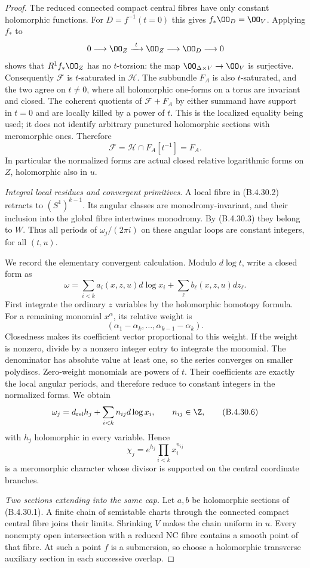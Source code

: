 \begin{proof}
The reduced connected compact central fibres
have only constant holomorphic functions.
For $D=f^{-1}(t=0)$ this gives
$f_*\OO_D=\OO_V$. Applying $f_*$ to
\[
 0\longrightarrow\OO_Z\xrightarrow{\ t\ }
 \OO_Z\longrightarrow\OO_D\longrightarrow0
\]
shows that $R^1f_*\OO_Z$ has no $t$-torsion:
the map $\OO_{\Delta\times V}\to\OO_V$ is
surjective. Consequently $\mathcal F$ is
$t$-saturated in $\mathcal H$. The subbundle
$F_A$ is also $t$-saturated, and the two agree
on $t\ne0$, where all holomorphic one-forms
on a torus are invariant and closed. The
coherent quotients of $\mathcal F+F_A$ by
either summand have support in $t=0$ and
are locally killed by a power of $t$. This
is the localized equality being used; it
does not identify arbitrary punctured
holomorphic sections with meromorphic ones.
Therefore
\[
 \mathcal F=\mathcal H\cap F_A[t^{-1}]=F_A.
 \tag{B.4.30.5}
\]
In particular the normalized forms are actual
closed relative logarithmic forms on $Z$,
holomorphic also in $u$.

\emph{Integral local residues and convergent primitives.}
A local fibre in (B.4.30.2) retracts to
$(S^1)^{k-1}$. Its angular classes are
monodromy-invariant, and their inclusion into
the global fibre intertwines monodromy. By
(B.4.30.3) they belong to $W$. Thus all periods
of $\omega_j/(2\pi i)$ on these angular loops
are constant integers, for all $(t,u)$.

We record the elementary convergent calculation.
Modulo $d\log t$, write a closed form as
\[
 \omega=\sum_{i<k}a_i(x,z,u)d\log x_i
                   +\sum_\ell b_\ell(x,z,u)dz_\ell.
\]
First integrate the ordinary $z$ variables by
the holomorphic homotopy formula. For a
remaining monomial $x^\alpha$, its relative
weight is
\[
 (\alpha_1-\alpha_k,\ldots,\alpha_{k-1}-\alpha_k).
\]
Closedness makes its coefficient vector
proportional to this weight. If the weight is
nonzero, divide by a nonzero integer entry to
integrate the monomial. The denominator has
absolute value at least one, so the series
converges on smaller polydiscs. Zero-weight
monomials are powers of $t$. Their coefficients
are exactly the local angular periods, and
therefore reduce to constant integers in the
normalized forms. We obtain
\[
 \omega_j=d_{\rm rel}h_j+
               \sum_{i<k}n_{ij}d\log x_i,
 \qquad n_{ij}\in\Z,
 \tag{B.4.30.6}
\]
with $h_j$ holomorphic in every variable.
Hence
\[
 \chi_j=e^{h_j}\prod_{i<k}x_i^{n_{ij}}
 \tag{B.4.30.7}
\]
is a meromorphic character whose divisor is
supported on the central coordinate branches.

\emph{Two sections extending into the same cap.}
Let $a,b$ be holomorphic sections of (B.4.30.1).
A finite chain of semistable charts through the
connected compact central fibre joins their
limits. Shrinking $V$ makes the chain uniform
in $u$. Every nonempty open intersection with
a reduced NC fibre contains a smooth point of
that fibre. At such a point $f$ is a
submersion, so choose a holomorphic transverse
auxiliary section in each successive overlap.


\end{proof}
